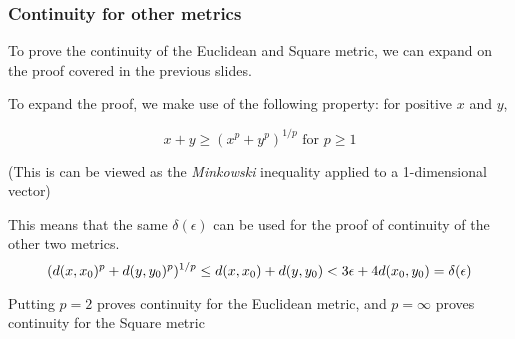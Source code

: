 \begin{frame}
    \frametitle{Continuity for other metrics}

    To prove the continuity of the Euclidean and Square metric, we can expand on the proof covered in the previous slides.

    \pause
    To expand the proof, we make use of the following property:
    for positive \(x\) and \(y\),
     
    \begin{equation}
        x+y \geq (x^p+y^p)^{1/p} \text{ for } p \geq 1
    \end{equation}

    (This is can be viewed as the \textit{Minkowski} inequality applied to a 1-dimensional vector)

    \pause

    This means that the same \(\delta(\epsilon)\) can be used for the proof of continuity of the other two metrics.
    \begin{equation}
        (d(x, x_0)^p + d(y, y_0)^p)^{1/p} \leq d(x, x_0) + d(y, y_0) < 3\epsilon + 4d(x_0, y_0) = \delta(\epsilon)
    \end{equation}

    Putting \(p = 2\) proves continuity for the Euclidean metric, and \(p=\infty\) proves continuity for the Square metric
    
\end{frame}

